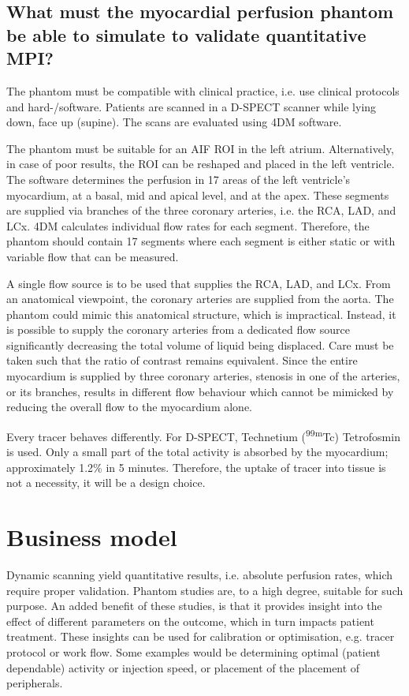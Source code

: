 \subsection{What must the myocardial perfusion phantom be able to simulate to validate quantitative MPI?}
\label{sec:what_perf}
The phantom must be compatible with clinical practice, i.e. use clinical protocols and hard-/software. Patients are scanned in a D-SPECT scanner while lying down, face up (supine). The scans are evaluated using 4DM software. 

The phantom must be suitable for an \ac{AIF} ROI in the left atrium. Alternatively, in case of poor results, the ROI can be reshaped and placed in the left ventricle. The software determines the perfusion in 17 areas of the left ventricle's myocardium, at a basal, mid and apical level, and at the apex. These segments are supplied via branches of the three coronary arteries, i.e. the RCA, LAD, and LCx. 4DM calculates individual flow rates for each segment. Therefore, the phantom should contain 17 segments where each segment is either static or with variable flow that can be measured. 

A single flow source is to be used that supplies the RCA, LAD, and LCx. From an anatomical viewpoint, the coronary arteries are supplied from the aorta. The phantom could mimic this anatomical structure, which is impractical. Instead, it is possible to supply the coronary arteries from a dedicated flow source significantly decreasing the total volume of liquid being displaced. Care must be taken such that the ratio of contrast remains equivalent. Since the entire myocardium is supplied by three coronary arteries, stenosis in one of the arteries, or its branches, results in different flow behaviour which cannot be mimicked by reducing the overall flow to the myocardium alone.

Every tracer behaves differently. For D-SPECT, Technetium (\textsuperscript{99m}Tc) Tetrofosmin is used. Only a small part of the total activity is absorbed by the myocardium; approximately 1.2\% in 5 minutes. Therefore, the uptake of tracer into tissue is not a necessity, it will be a design choice. 

\section{Business model}
\label{sec:bus_model}
Dynamic scanning yield quantitative results, i.e. absolute perfusion rates, which require proper validation. Phantom studies are, to a high degree, suitable for such purpose. An added benefit of these studies, is that it provides insight into the effect of different parameters on the outcome, which in turn impacts patient treatment. These insights can be used for calibration or optimisation, e.g. tracer protocol or work flow. Some examples would be determining optimal (patient dependable) activity or injection speed, or placement of the placement of peripherals.

